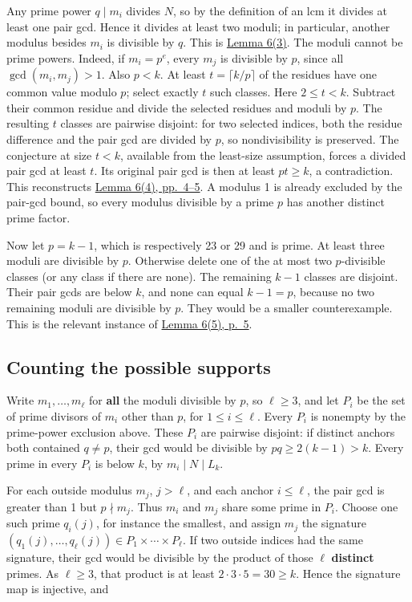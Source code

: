 \documentclass[11pt,a4paper]{article}
\begin{document}
Any prime power \(q\mid m_i\) divides \(N\), so by the definition of an lcm it divides at least one pair gcd. Hence it divides at least two moduli; in particular, another modulus besides \(m_i\) is divisible by \(q\). This is \href{https://arxiv.org/pdf/math/0604347v2}{Lemma 6(3)}. The moduli cannot be prime powers. Indeed, if \(m_i=p^e\), every \(m_j\) is divisible by \(p\), since all \(\gcd(m_i,m_j)>1\). Also \(p<k\). At least \(t=\lceil k/p\rceil\) of the residues have one common value modulo \(p\); select exactly \(t\) such classes. Here \(2\le t<k\). Subtract their common residue and divide the selected residues and moduli by \(p\). The resulting \(t\) classes are pairwise disjoint: for two selected indices, both the residue difference and the pair gcd are divided by \(p\), so nondivisibility is preserved. The conjecture at size \(t<k\), available from the least-size assumption, forces a divided pair gcd at least \(t\). Its original pair gcd is then at least \(pt\ge k\), a contradiction. This reconstructs \href{https://arxiv.org/pdf/math/0604347v2}{Lemma 6(4), pp.~4--5}. A modulus 1 is already excluded by the pair-gcd bound, so every modulus divisible by a prime \(p\) has another distinct prime factor.

Now let \(p=k-1\), which is respectively 23 or 29 and is prime. At least three moduli are divisible by \(p\). Otherwise delete one of the at most two \(p\)-divisible classes (or any class if there are none). The remaining \(k-1\) classes are disjoint. Their pair gcds are below \(k\), and none can equal \(k-1=p\), because no two remaining moduli are divisible by \(p\). They would be a smaller counterexample. This is the relevant instance of \href{https://arxiv.org/pdf/math/0604347v2}{Lemma 6(5), p.~5}.

\subsection{Counting the possible supports}\label{counting-the-possible-supports}

Write \(m_1,\ldots,m_\ell\) for \textbf{all} the moduli divisible by \(p\), so \(\ell\ge3\), and let \(P_i\) be the set of prime divisors of \(m_i\) other than \(p\), for \(1\le i\le\ell\). Every \(P_i\) is nonempty by the prime-power exclusion above. These \(P_i\) are pairwise disjoint: if distinct anchors both contained \(q\ne p\), their gcd would be divisible by \(pq\ge2(k-1)>k\). Every prime in every \(P_i\) is below \(k\), by \(m_i\mid N\mid L_k\).

For each outside modulus \(m_j\), \(j>\ell\), and each anchor \(i\le\ell\), the pair gcd is greater than 1 but \(p\nmid m_j\). Thus \(m_i\) and \(m_j\) share some prime in \(P_i\). Choose one such prime \(q_i(j)\), for instance the smallest, and assign \(m_j\) the signature \((q_1(j),\ldots,q_\ell(j))\in P_1\times\cdots\times P_\ell\). If two outside indices had the same signature, their gcd would be divisible by the product of those \(\ell\) \textbf{distinct} primes. As \(\ell\ge3\), that product is at least \(2\cdot3\cdot5=30\ge k\). Hence the signature map is injective, and
\end{document}
